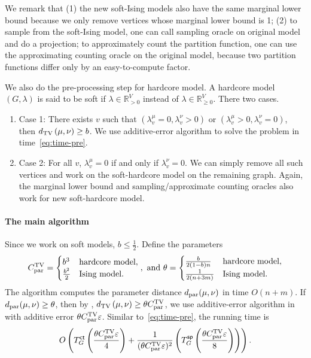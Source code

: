 \begin{enumerate}
    
    We remark that (1) the new soft-Ising models also have the same marginal lower bound because we only remove vertices whose marginal lower bound is 1; (2) to sample from the soft-Ising model, one can call sampling oracle on original model and do a projection; to approximately count the partition function, one can use the approximating counting oracle on the original model, because two partition functions differ only by an easy-to-compute factor.
\end{enumerate}

We also do the pre-processing step for hardcore model. A hardcore model $(G,\lambda)$ is said to be soft if $\lambda \in \mathbb{R}_{>0}^V$ instead of $\lambda \in \mathbb{R}_{\geq 0}^V$. There two cases.
\begin{enumerate}
    \item Case 1: There exists $v$ such that $(\lambda^\mu_v = 0,\lambda^\nu_v > 0)$ or $(\lambda^\mu_v > 0,\lambda^\nu_v = 0)$, then $d_{\mathrm{TV}}\left({\mu},{\nu}\right) \geq b$. We use additive-error algorithm to solve the problem in time~\eqref{eq:time-pre}.
    \item Case 2: For all $v$, $\lambda^\mu_v = 0$ if and only if $\lambda^\nu_v = 0$. We can simply remove all such vertices and work on the soft-hardcore model on the remaining graph. Again, the marginal lower bound and sampling/approximate counting oracles also work for new soft-hardcore model.
\end{enumerate}

\paragraph{The main algorithm}
Since we work on soft models, $b\leq \frac{1}{2}$. 
Define the parameters
\begin{align*}
    C^\text{TV}_{\mathrm{par}} = \begin{cases}
         b^3 &\text{hardcore model},\\
         \frac{b^2}{2} &\text{Ising model}.
     \end{cases}, \text{ and } 
     \theta = \begin{cases}
         \frac{b}{2(1-b)n} &\text{hardcore model},\\
         \frac{1}{2(n+3m)} &\text{Ising model}.
     \end{cases}
\end{align*}
The algorithm computes the parameter distance $d_\mathrm{par}(\mu,\nu)$ in time $O(n + m)$.
If $d_\mathrm{par}(\mu,\nu) \geq \theta$, then by , $d_{\mathrm{TV}}\left({\mu},{\nu}\right) \geq \theta C^\text{TV}_{\mathrm{par}}$, we use additive-error algorithm in  with additive error $\theta C^\text{TV}_{\mathrm{par}} \varepsilon$. Similar to~\eqref{eq:time-pre}, the running time is 
\begin{align}\label{eq:time-add}
   O\left(T^{\textsf{ct}}_G\left(\frac{\theta C^\text{TV}_{\mathrm{par}} \varepsilon}{4}\right)+ \frac{1}{(\theta C^\text{TV}_{\mathrm{par}} \varepsilon)^2}\left(T^{\textsf{sp}}_G\left(\frac{\theta C^\text{TV}_{\mathrm{par}} \varepsilon}{8}\right)\right)\right).
\end{align}


